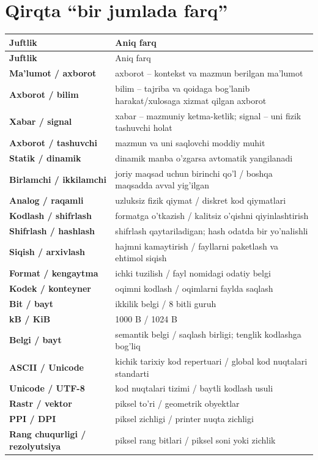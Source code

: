 \documentclass[11pt,a4paper,oneside]{book}
\begin{document}
\section{Qirqta ``bir jumlada farq''}
\begin{longtable}{>{\bfseries\color{teal}}p{45mm}p{105mm}}
\toprule
Juftlik & Aniq farq\\
\midrule
\endfirsthead\toprule Juftlik & Aniq farq\\\midrule\endhead
Ma'lumot / axborot & axborot -- kontekst va mazmun berilgan ma'lumot\\
Axborot / bilim & bilim -- tajriba va qoidaga bog'lanib harakat/xulosaga xizmat qilgan axborot\\
Xabar / signal & xabar -- mazmuniy ketma-ketlik; signal -- uni fizik tashuvchi holat\\
Axborot / tashuvchi & mazmun va uni saqlovchi moddiy muhit\\
Statik / dinamik & dinamik manba o'zgarsa avtomatik yangilanadi\\
Birlamchi / ikkilamchi & joriy maqsad uchun birinchi qo'l / boshqa maqsadda avval yig'ilgan\\
Analog / raqamli & uzluksiz fizik qiymat / diskret kod qiymatlari\\
Kodlash / shifrlash & formatga o'tkazish / kalitsiz o'qishni qiyinlashtirish\\
Shifrlash / hashlash & shifrlash qaytariladigan; hash odatda bir yo'nalishli\\
Siqish / arxivlash & hajmni kamaytirish / fayllarni paketlash va ehtimol siqish\\
Format / kengaytma & ichki tuzilish / fayl nomidagi odatiy belgi\\
Kodek / konteyner & oqimni kodlash / oqimlarni faylda saqlash\\
Bit / bayt & ikkilik belgi / 8 bitli guruh\\
kB / KiB & 1000 B / 1024 B\\
Belgi / bayt & semantik belgi / saqlash birligi; tenglik kodlashga bog'liq\\
ASCII / Unicode & kichik tarixiy kod repertuari / global kod nuqtalari standarti\\
Unicode / UTF-8 & kod nuqtalari tizimi / baytli kodlash usuli\\
Rastr / vektor & piksel to'ri / geometrik obyektlar\\
PPI / DPI & piksel zichligi / printer nuqta zichligi\\
Rang chuqurligi / rezolyutsiya & piksel rang bitlari / piksel soni yoki zichlik\\

\end{longtable}
\end{document}
